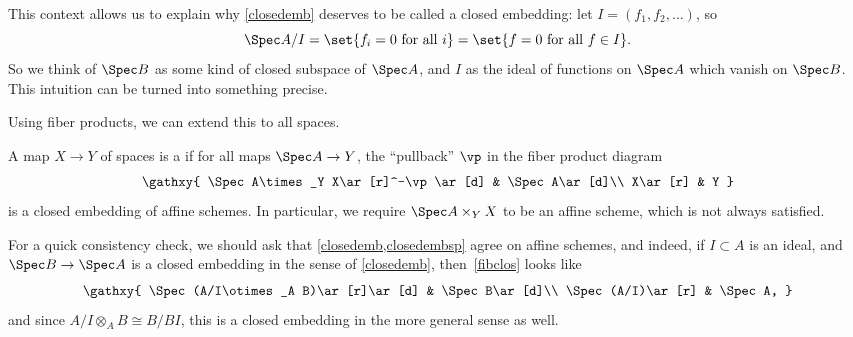 This context allows us to explain why \cref{closedemb} deserves to be called a closed embedding: let $I =
(f_1,f_2,\dotsc)$, so
\begin{equation}
	\Spec A/I = \set{f_i = 0\text{ for all } i} = \set{f = 0\text{ for all } f\in I}.
\end{equation}
So we think of $\Spec B$ as some kind of closed subspace of $\Spec A$, and $I$ as the ideal of functions on $\Spec
A$ which vanish on $\Spec B$. This intuition can be turned into something precise.

Using fiber products, we can extend this to all spaces.
\begin{defn}
\label{closedembsp}
A map $X\to Y$ of spaces is a  if for all maps $\Spec A\to Y$, the ``pullback'' $\vp$ in the
fiber product diagram
\begin{equation}
\label{fibclos}
\gathxy{
	\Spec A\times_Y X\ar[r]^-\vp\ar[d] & \Spec A\ar[d]\\
	X\ar[r] & Y
}
\end{equation}
is a closed embedding of affine schemes. In particular, we require $\Spec A\times_Y X$ to be an affine scheme,
which is not always satisfied.
\end{defn}
For a quick consistency check, we should ask that \cref{closedemb,closedembsp} agree on affine schemes, and indeed,
if $I\subset A$ is an ideal, and $\Spec B\to\Spec A$ is a closed embedding in the sense of \cref{closedemb},
then~\eqref{fibclos} looks like
\begin{equation}
\gathxy{
	\Spec(A/I\otimes_A B)\ar[r]\ar[d] & \Spec B\ar[d]\\
	\Spec(A/I)\ar[r] & \Spec A,
}
\end{equation}
and since $A/I\otimes_A B\cong B/BI$, this is a closed embedding in the more general sense as well.

